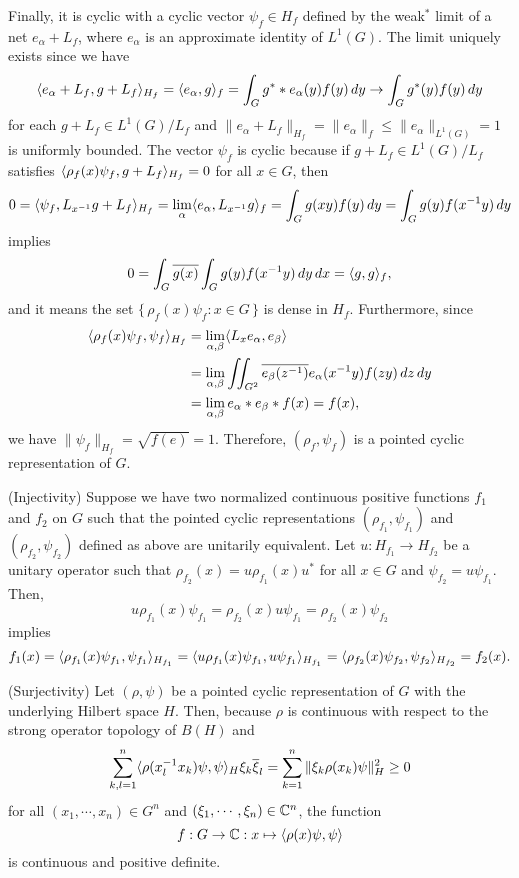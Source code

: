 \documentclass[a4paper]{article}
\begin{document}
\begin{pf}
Finally, it is cyclic with a cyclic vector $\psi_f\in H_f$ defined by the weak$^*$ limit of a net $e_\alpha+L_f$, where $e_\alpha$ is an approximate identity of $L^1(G)$.
The limit uniquely exists since we have
\[\langle e_\alpha+L_f,g+L_f\rangle_{H_f}=\langle e_\alpha,g\rangle_f=\int_Gg^**e_\alpha(y)f(y)\,dy\to\int_Gg^*(y)f(y)\,dy\]
for each $g+L_f\in L^1(G)/L_f$ and $\|e_\alpha+L_f\|_{H_f}=\|e_\alpha\|_f\le\|e_\alpha\|_{L^1(G)}=1$ is uniformly bounded.
The vector $\psi_f$ is cyclic because if $g+L_f\in L^1(G)/L_f$ satisfies $\langle\rho_f(x)\psi_f,g+L_f\rangle_{H_f}=0$ for all $x\in G$, then
\[0=\langle\psi_f,L_{x^{-1}}g+L_f\rangle_{H_f}=\lim_\alpha\langle e_\alpha,L_{x^{-1}}g\rangle_f=\int_Gg(xy)f(y)\,dy=\int_Gg(y)f(x^{-1}y)\,dy\]
implies
\[0=\int_G\overline{g(x)}\int_Gg(y)f(x^{-1}y)\,dy\,dx=\langle g,g\rangle_f,\]
and it means the set $\{\,\rho_f(x)\psi_f:x\in G\,\}$ is dense in $H_f$.
Furthermore, since
\begin{align*}
\langle\rho_f(x)\psi_f,\psi_f\rangle_{H_f}&=\lim_{\alpha,\beta}\langle L_xe_\alpha,e_\beta\rangle\\
&=\lim_{\alpha,\beta}\iint_{G^2}\overline{e_\beta(z^{-1})}e_\alpha(x^{-1}y)f(zy)\,dz\,dy\\
&=\lim_{\alpha,\beta}e_\alpha*e_\beta*f(x)=f(x),\end{align*}
we have $\|\psi_f\|_{H_f}=\sqrt{f(e)}=1$.
Therefore, $(\rho_f,\psi_f)$ is a pointed cyclic representation of $G$.

(Injectivity)
Suppose we have two normalized continuous positive functions $f_1$ and $f_2$ on $G$ such that the pointed cyclic representations $(\rho_{f_1},\psi_{f_1})$ and $(\rho_{f_2},\psi_{f_2})$ defined as above are unitarily equivalent.
Let $u:H_{f_1}\to H_{f_2}$ be a unitary operator such that $\rho_{f_2}(x)=u\rho_{f_1}(x)u^*$ for all $x\in G$ and $\psi_{f_2}=u\psi_{f_1}$.
Then,
\[u\rho_{f_1}(x)\psi_{f_1}=\rho_{f_2}(x)u\psi_{f_1}=\rho_{f_2}(x)\psi_{f_2}\]
implies
\[f_1(x)=\langle\rho_{f_1}(x)\psi_{f_1},\psi_{f_1}\rangle_{H_{f_1}}=\langle u\rho_{f_1}(x)\psi_{f_1},u\psi_{f_1}\rangle_{H_{f_1}}=\langle\rho_{f_2}(x)\psi_{f_2},\psi_{f_2}\rangle_{H_{f_2}}=f_2(x).\]

(Surjectivity)
Let $(\rho,\psi)$ be a pointed cyclic representation of $G$ with the underlying Hilbert space $H$.
Then, because $\rho$ is continuous with respect to the strong operator topology of $B(H)$ and
\[\sum_{k,l=1}^n\langle\rho(x_l^{-1}x_k)\psi,\psi\rangle_H\xi_k\overline\xi_l=\sum_{k=1}^n\|\xi_k\rho(x_k)\psi\|_H^2\ge0\]
for all $(x_1,\cdots,x_n)\in G^n$ and $(\xi_1,\cdots,\xi_n)\in\mathbb{C}^n$, the function
\[f:G\to\mathbb{C}:x\mapsto\langle\rho(x)\psi,\psi\rangle\]
is continuous and positive definite.


\end{pf}
\end{document}
